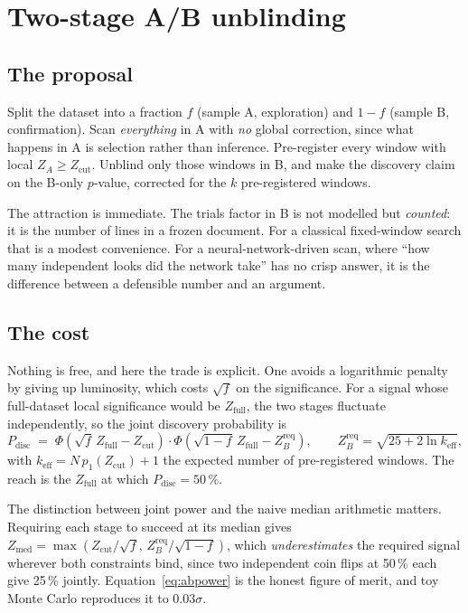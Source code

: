 \section{Two-stage A/B unblinding}
\label{sec:ab}

\subsection{The proposal}

Split the dataset into a fraction $f$ (sample A, exploration) and $1-f$ (sample B, confirmation).
Scan \emph{everything} in A with \emph{no} global correction, since what happens in A is selection
rather than inference. Pre-register every window with local $Z_A \ge Z_{\mathrm{cut}}$. Unblind
only those windows in B, and make the discovery claim on the B-only $p$-value, corrected for the
$k$ pre-registered windows.

The attraction is immediate. The trials factor in B is not modelled but \emph{counted}: it is the
number of lines in a frozen document. For a classical fixed-window search that is a modest
convenience. For a neural-network-driven scan, where ``how many independent looks did the network
take'' has no crisp answer, it is the difference between a defensible number and an argument.

\subsection{The cost}

Nothing is free, and here the trade is explicit. One avoids a logarithmic penalty by giving up
luminosity, which costs $\sqrt{f}$ on the significance. For a signal whose full-dataset
local significance would be $Z_{\mathrm{full}}$, the two stages fluctuate independently, so the
joint discovery probability is
\begin{equation}
  P_{\mathrm{disc}}
  \;=\;
  \Phi\!\left(\sqrt{f}\,Z_{\mathrm{full}} - Z_{\mathrm{cut}}\right)
  \cdot
  \Phi\!\left(\sqrt{1-f}\,Z_{\mathrm{full}} - Z_{B}^{\mathrm{req}}\right),
  \qquad
  Z_B^{\mathrm{req}} = \sqrt{25 + 2\ln k_{\mathrm{eff}}},
  \label{eq:abpower}
\end{equation}
with $k_{\mathrm{eff}} = N\,p_1(Z_{\mathrm{cut}}) + 1$ the expected number of pre-registered
windows. The reach is the $Z_{\mathrm{full}}$ at which $P_{\mathrm{disc}} = 50\,\%$.

The distinction between joint power and the naive median arithmetic matters. Requiring each stage
to succeed at its median gives $Z_{\mathrm{med}} = \max(Z_{\mathrm{cut}}/\sqrt{f},\,
Z_B^{\mathrm{req}}/\sqrt{1-f})$, which \emph{underestimates} the required signal wherever both
constraints bind, since two independent coin flips at 50\,\% each give 25\,\% jointly.
Equation~\eqref{eq:abpower} is the honest figure of merit, and toy Monte Carlo reproduces it to
$0.03\sigma$.

